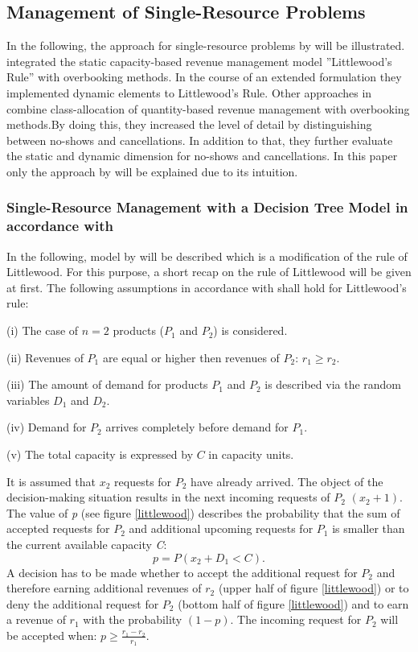 \subsection{Management of Single-Resource Problems}
In the following, the approach for single-resource problems by \citet{klein2008} will be illustrated. \citet{klein2008} integrated the static capacity-based revenue management model ''Littlewood's Rule'' with overbooking methods. In the course of an extended formulation they implemented dynamic elements to Littlewood's Rule. Other approaches in \citet[Chapter 4]{talluri2004} combine class-allocation of quantity-based revenue management with overbooking methods.By doing this, they increased the level of detail by distinguishing between no-shows and cancellations. In addition to that, they further evaluate the static and dynamic dimension for no-shows and cancellations. In this paper only the approach by \citet{klein2008} will be explained due to its intuition.
\subsubsection{Single-Resource Management with a Decision Tree Model in accordance with \citet{bodily1995}}
In the following, model by \citet{bodily1995} will be described which is a modification of the rule of Littlewood. For this purpose, a short recap on the rule of Littlewood will be given at first. The following assumptions in accordance with \citet[p.86]{klein2008} shall hold for Littlewood's rule:
\begin{description}
	\item(i) The case of $n = 2$ products ($P_{1}$ and $P_{2}$) is considered.
	\item(ii) Revenues of $P_{1}$ are equal or higher then revenues of $P_{2}$: $r_{1}\geq r_{2}$.
	\item(iii) The amount of demand for products $P_{1}$ and $P_{2}$ is described via the random variables $D_{1}$ and $D_{2}$.
	\item(iv) Demand for $P_{2}$ arrives completely before demand for $P_{1}$.
	\item(v) The total capacity is expressed by $C$ in capacity units.
\end{description}
It is assumed that $x_{2}$ requests for $P_{2}$ have already arrived. The object of the decision-making situation results in the next incoming requests of $P_{2}$ $(x_{2}+1)$. The value of \textit{p} (see figure \ref{littlewood}) describes the probability that the sum of accepted requests for $P_{2}$ and additional upcoming requests for $P_{1}$ is smaller than the current available capacity \textit{C}:
\begin{equation}
p=P(x_{2}+D_{1}<C).
\end{equation}
A decision has to be made whether to accept the additional request for $P_{2}$ and therefore earning additional revenues of $r_{2}$ (upper half of figure \ref{littlewood}) or to deny the additional request for $P_{2}$ (bottom half of figure \ref{littlewood}) and to earn a revenue of $r_{1}$ with the probability $(1-p)$. The incoming request for $P_{2}$ will be accepted when: $p\geq\frac{r_{1}-r_{2}}{r_{1}}$.

